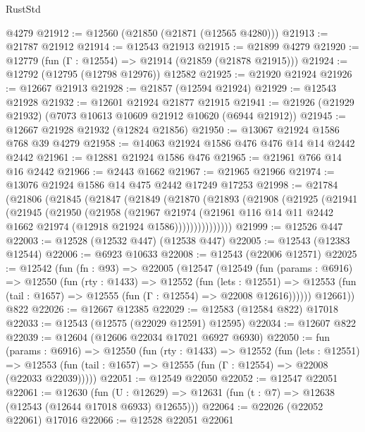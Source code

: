 \begin{lexlean}{RustStd}
\begin{coremodule}
    @4279
@21912 := @12560 (@21850 (@21871 (@12565 @4280)))
@21913 := @21787 @21912
@21914 := @12543 @21913
@21915 := @21899 @4279
@21920 := @12779 (fun (Γ : @12554) => @21914 (@21859 (@21878 @21915)))
@21924 := @12792 (@12795 (@12798 @12976)) @12582
@21925 := @21920 @21924
@21926 := @12667 @21913
@21928 := @21857 (@12594 @21924)
@21929 := @12543 @21928
@21932 := @12601 @21924 @21877 @21915
@21941 := @21926 (@21929 @21932) (@7073 @10613 @10609 @21912 @10620 (@6944 @21912))
@21945 := @12667 @21928 @21932 (@12824 @21856)
@21950 := @13067 @21924 @1586 @768 @39 @4279
@21958 := @14063 @21924 @1586 @476 @476 @14 @14 @2442 @2442
@21961 := @12881 @21924 @1586 @476
@21965 := @21961 @766 @14 @16 @2442
@21966 := @2443 @1662
@21967 := @21965 @21966
@21974 := @13076 @21924 @1586 @14 @475 @2442 @17249 @17253
@21998 := @21784
    (@21806
      (@21845
        (@21847
          (@21849
            (@21870
              (@21893
                (@21908
                  (@21925
                    (@21941
                      (@21945
                        (@21950
                          (@21958
                            (@21967
                              @21974
                              (@21961
                                @116
                                @14
                                @11
                                @2442
                                @1662
                                @21974
                                (@12918 @21924 @1586)))))))))))))))
@21999 := @12526 @447
@22003 := @12528 (@12532 @447) (@12538 @447)
@22005 := @12543 (@12383 @12544)
@22006 := @6923 @10633
@22008 := @12543 (@22006 @12571)
@22025 := @12542
    (fun (fn : @93) =>
    @22005
      (@12547
        (@12549
          (fun (params : @6916) =>
          @12550
            (fun (rty : @1433) =>
            @12552
              (fun (lets : @12551) =>
              @12553 (fun (tail : @1657) => @12555 (fun (Γ : @12554) => @22008 @12616))))))
        @12661))
    @822
@22026 := @12667 @12385
@22029 := @12583 (@12584 @822) @17018
@22033 := @12543 (@12575 (@22029 @12591) @12595)
@22034 := @12607 @822
@22039 := @12604 (@12606 @22034 @17021 @6927 @6930)
@22050 := fun (params : @6916) =>
  @12550
    (fun (rty : @1433) =>
    @12552
      (fun (lets : @12551) =>
      @12553 (fun (tail : @1657) => @12555 (fun (Γ : @12554) => @22008 (@22033 @22039)))))
@22051 := @12549 @22050
@22052 := @12547 @22051
@22061 := @12630
    (fun (U : @12629) => @12631 (fun (t : @7) => @12638 (@12543 (@12644 @17018 @6933) @12655)))
@22064 := @22026 (@22052 @22061) @17016
@22066 := @12528 @22051 @22061

\end{coremodule}
\end{lexlean}
